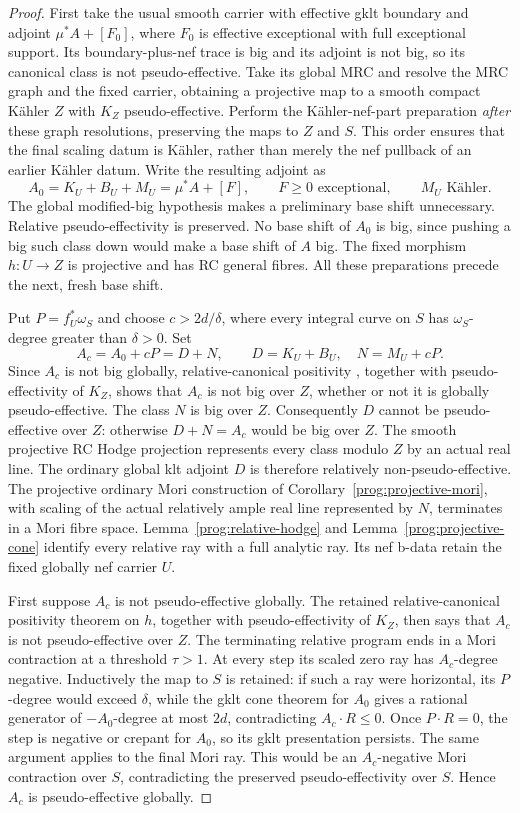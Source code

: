 \begin{proof}
First take the usual smooth carrier with effective gklt boundary
and adjoint $\mu^*A+[F_0]$, where $F_0$ is effective exceptional
with full exceptional support. Its boundary-plus-nef trace is big and its adjoint
is not big, so its canonical class is not pseudo-effective. Take
its global MRC and resolve the MRC graph and the fixed carrier,
obtaining a projective map to a smooth compact K\"ahler $Z$ with
$K_Z$ pseudo-effective.
Perform the K\"ahler-nef-part preparation \emph{after} these graph
resolutions, preserving the maps to $Z$ and $S$. This order ensures
that the final scaling datum is K\"ahler, rather than merely the nef
pullback of an earlier K\"ahler datum. Write the resulting adjoint as
\[
 A_0=K_U+B_U+M_U=\mu^*A+[F],
 \qquad F\geq0\text{ exceptional},\qquad M_U\text{ K\"ahler}.
\]
The global modified-big hypothesis makes a preliminary base shift
unnecessary. Relative pseudo-effectivity is preserved.
No base shift of $A_0$ is big, since pushing a big such class down
would make a base shift of $A$ big. The fixed morphism $h:U\to Z$
is projective and has RC general fibres. All these preparations
precede the next, fresh base shift.

Put $P=f_U^*\omega_S$ and choose $c>2d/\delta$, where every
integral curve on $S$ has $\omega_S$-degree greater than
$\delta>0$. Set
\[
 A_c=A_0+cP=D+N,\qquad D=K_U+B_U,\quad N=M_U+cP.
\]
Since $A_c$ is not big globally, relative-canonical positivity
\cite[Theorem~2.48(2)]{HX}, together with pseudo-effectivity of $K_Z$,
shows that $A_c$ is not big over $Z$, whether or not it is globally
pseudo-effective. The class $N$ is big over $Z$. Consequently $D$
cannot be pseudo-effective over $Z$: otherwise $D+N=A_c$ would be
big over $Z$. The smooth projective RC Hodge projection represents
every class modulo $Z$ by an actual real line. The ordinary global klt adjoint $D$ is therefore relatively
non-pseudo-effective. The projective ordinary Mori construction of
Corollary~\ref{prog:projective-mori}, with scaling of the actual
relatively ample real line represented by $N$, terminates in a Mori
fibre space. Lemma~\ref{prog:relative-hodge} and
Lemma~\ref{prog:projective-cone} identify every relative ray
with a full analytic ray. Its nef b-data retain the fixed globally
nef carrier $U$.

First suppose $A_c$ is not pseudo-effective globally. The retained
relative-canonical positivity theorem on $h$, together with
pseudo-effectivity of $K_Z$, then says that $A_c$ is not
pseudo-effective over $Z$. The terminating relative program ends
in a Mori contraction at a threshold $\tau>1$. At every step its
scaled zero ray has $A_c$-degree negative. Inductively the map to
$S$ is retained: if such a ray were horizontal, its $P$-degree
would exceed $\delta$, while the gklt cone theorem for $A_0$ gives
a rational generator of $-A_0$-degree at most $2d$, contradicting
$A_c\cdot R\leq0$. Once $P\cdot R=0$, the step is negative or
crepant for $A_0$, so its gklt presentation persists. The same
argument applies to the final Mori ray. This would be an
$A_c$-negative Mori contraction over $S$, contradicting the
preserved pseudo-effectivity over $S$. Hence $A_c$ is
pseudo-effective globally.


\end{proof}
